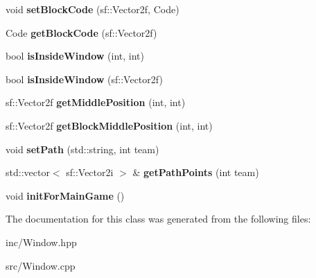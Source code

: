 \begin{DoxyCompactItemize}
\item 
\hypertarget{class_window_a36156325920c078ad0359d13626ec522}{void {\bfseries set\+Block\+Code} (sf\+::\+Vector2f, Code)}\label{class_window_a36156325920c078ad0359d13626ec522}

\item 
\hypertarget{class_window_a56b4a60727eb083e8f811daeb17bb0cd}{Code {\bfseries get\+Block\+Code} (sf\+::\+Vector2f)}\label{class_window_a56b4a60727eb083e8f811daeb17bb0cd}

\item 
\hypertarget{class_window_acdfbc2752cf96443784dcfbaa6b0981e}{bool {\bfseries is\+Inside\+Window} (int, int)}\label{class_window_acdfbc2752cf96443784dcfbaa6b0981e}

\item 
\hypertarget{class_window_acfbf0fe001c2213bcd341f446d2db255}{bool {\bfseries is\+Inside\+Window} (sf\+::\+Vector2f)}\label{class_window_acfbf0fe001c2213bcd341f446d2db255}

\item 
\hypertarget{class_window_a5c68d1e6394740b4e0d9a4e728d077b3}{sf\+::\+Vector2f {\bfseries get\+Middle\+Position} (int, int)}\label{class_window_a5c68d1e6394740b4e0d9a4e728d077b3}

\item 
\hypertarget{class_window_af1c4a43a14167630c452d1bbb1f7a09e}{sf\+::\+Vector2f {\bfseries get\+Block\+Middle\+Position} (int, int)}\label{class_window_af1c4a43a14167630c452d1bbb1f7a09e}

\item 
\hypertarget{class_window_aa77838cc1fb9aa039e594498933d560c}{void {\bfseries set\+Path} (std\+::string, int team)}\label{class_window_aa77838cc1fb9aa039e594498933d560c}

\item 
\hypertarget{class_window_adc0a34a943adc79f9bdd3c1786e03f07}{std\+::vector$<$ sf\+::\+Vector2i $>$ \& {\bfseries get\+Path\+Points} (int team)}\label{class_window_adc0a34a943adc79f9bdd3c1786e03f07}

\item 
\hypertarget{class_window_ac4833c75691753d236b7daa3e493ed0e}{void {\bfseries init\+For\+Main\+Game} ()}\label{class_window_ac4833c75691753d236b7daa3e493ed0e}

\end{DoxyCompactItemize}


The documentation for this class was generated from the following files\+:\begin{DoxyCompactItemize}
\item 
inc/Window.\+hpp\item 
src/Window.\+cpp\end{DoxyCompactItemize}
